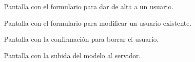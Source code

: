 \begin{figure}[h]
	\caption{Pantalla con el formulario para dar de alta a un usuario.}
	\label{fig:agregar_usuario}
\end{figure}

\begin{figure}[h]
	\caption{Pantalla con el formulario para modificar un usuario existente.}
	\label{fig:modificar_usuario}
\end{figure}

\begin{figure}[h]
	\caption{Pantalla con la confirmación para borrar el usuario.}
	\label{fig:eliminar_usuario}
\end{figure}

\begin{figure}[h]
	\caption{Pantalla con la subida del modelo al servidor.}
	\label{fig:modificar_modelo}
\end{figure}
